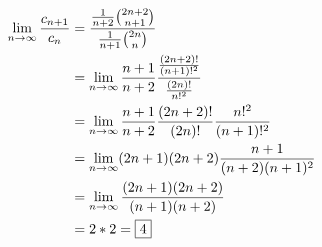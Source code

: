 \documentclass[12pt]{article}
\newcommand{\limtoinf}{\lim_{n\to\infty}}
\begin{document}
\begin {align*}
\limtoinf {c_{n+1}\over c_n} &= {{1\over n+2}{2n+2\choose n+1}\over {1\over n+1}{2n\choose n}}\\
&=\limtoinf {n+1\over n+2} {{{(2n+2)!\over (n+1)!^2}\over{(2n)!\over n!^2}}}\\
&= \limtoinf {n+1\over n+2} {(2n+2)!\over (2n)!}{n!^2\over (n+1)!^2}\\
&= \limtoinf (2n+1)(2n+2) {n+1\over (n+2)(n+1)^2}\\
&= \limtoinf {(2n+1)(2n+2)\over (n+1)(n+2)}\\
&= 2*2 = \fbox{4}
\end{align*}
\end{document}
